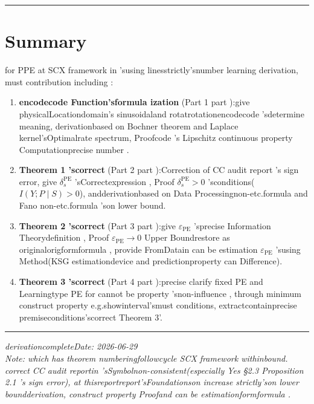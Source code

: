 \documentclass[
  12pt,
]{article}
\begin{document}
\begin{center}\rule{0.5\linewidth}{0.5pt}\end{center}

\section{Summary}\label{ux603bux7ed3}

for  PPE at  SCX framework in 'susing linesstrictly'snumber learning derivation, must contribution including : 

\begin{enumerate}
\def\labelenumi{\arabic{enumi}.}
\item
  \textbf{encodecode Function'sformula ization }(Part 1
  part ):give physicalLocationdomain's sinusoidaland rotatrotationencodecode 'sdetermine meaning, derivationbased on 
  Bochner theorem and  Laplace kernel'sOptimalrate spectrum, Proofcode 's Lipschitz
  continuous property Computationprecise number . 
\item
  \textbf{Theorem 1 'scorrect }(Part 2 part ):Correction of CC audit report 's sign
  error, give  \(\delta_s^{\text{PE}}\) 'sCorrectexpression , Proof
  \(\delta_s^{\text{PE}} > 0\)
  'sconditions(\(I(Y; P \mid S) > 0\)), andderivationbased on Data Processingnon-etc.formula and 
  Fano non-etc.formula 'son lower bound. 
\item
  \textbf{Theorem 2 'scorrect }(Part 3 part ):give 
  \(\varepsilon_{\text{PE}}\) 'sprecise Information Theorydefinition , Proof
  \(\varepsilon_{\text{PE}} \to 0\)
  Upper Boundrestore as originalorigformformula , provide FromDatain can be estimation
  \(\varepsilon_{\text{PE}}\) 'susing Method(KSG
  estimationdevice and predictionproperty can Difference). 
\item
  \textbf{Theorem 3 'scorrect }(Part 4 part ):precise clarify fixed  PE and Learningtype  PE
  for cannot be property 'snon-influence , through minimum construct property e.g.showinterval'smust conditions, extractcontainprecise premiseconditions'scorrect 
  Theorem 3'. 
\end{enumerate}

\begin{center}\rule{0.5\linewidth}{0.5pt}\end{center}

\emph{derivationcompleteDate: 2026-06-29}\\
\emph{Note: which has theorem numberingfollowcycle SCX framework withinbound. correct  CC
audit reportin 'sSymbolnon-consistent(especially Yes §2.3 Proposition 2.1 's sign
error), at thisreportreport'sFoundationson increase strictly'son lower boundderivation, construct property Proofand can be estimationformformula . }
\end{document}
